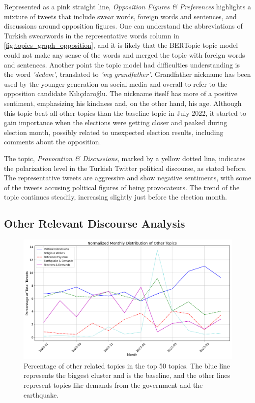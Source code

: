 Represented as a pink straight line, \textit{Opposition Figures \& Preferences} highlights a mixture of 
tweets that include swear words, foreign words and sentences, and discussions around opposition figures.
One can understand the abbreviations of Turkish swearwords in the representative words column in 
\autoref{fig:topics_graph_opposition}, and it is likely that the BERTopic topic model could not make any 
sense of the words and merged the topic with foreign words and sentences. 
Another point the topic model had difficulties understanding is the word \textit{'dedem'}, 
translated to \textit{'my grandfather'}. Grandfather nickname has been used by the younger generation on 
social media and overall to refer to the opposition candidate Kılıçdaroğlu. The nickname itself has more of a 
positive sentiment, emphasizing his kindness and, on the other hand, his age. 
Although this topic beat all other topics than the baseline topic in July 2022, it started to gain importance 
when the elections were getting closer and peaked during election month, possibly related to unexpected 
election results, including comments about the opposition.

The topic, \textit{Provocation \& Discussions}, marked by a yellow dotted line, indicates the polarization 
level in the Turkish Twitter political discourse, as stated before. The representative tweets are aggressive 
and show negative sentiments, with some of the tweets accusing political figures of being provocateurs. 
The trend of the topic continues steadily, increasing slightly just before the election month.

\subsection{Other Relevant Discourse Analysis}

\begin{figure}[htb]
    \centering
    \includegraphics[width=\linewidth]{figures/normalized_other_selected_topics_distribution_with_styles.png}
    \caption[Normalized monthly distribution of other related topics]
    {Percentage of other related topics in the top 50 topics. 
    The blue line represents the biggest cluster and is the baseline, 
    and the other lines represent topics like demands from the government and the earthquake.}\label{fig:topics_graph_other}
\end{figure}


